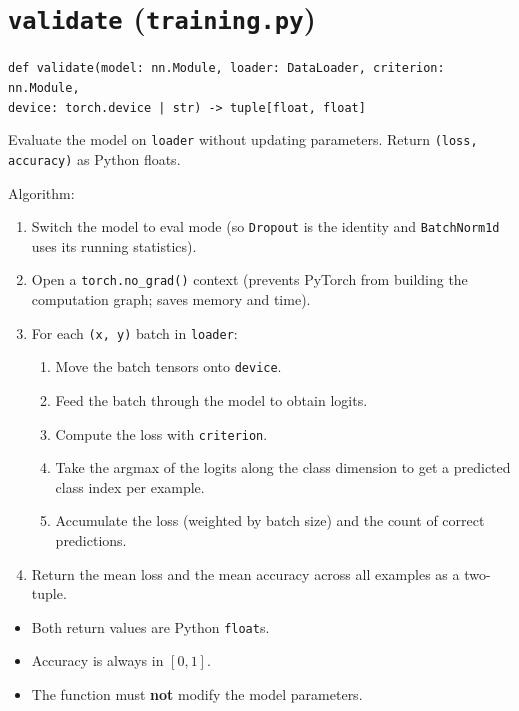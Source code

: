 \documentclass[11pt]{article}
\newcommand{\code}[1]{\texttt{\small #1}}
\begin{document}
\section{\texttt{validate} (\texttt{training.py})}

\noindent
\code{def validate(model: nn.Module, loader: DataLoader, criterion: nn.Module,}\\
\code{\hspace*{2em}device: torch.device | str) -> tuple[float, float]}

\medskip\noindent
Evaluate the model on \code{loader} without updating parameters. Return
\code{(loss, accuracy)} as Python floats.

\medskip\noindent
Algorithm:

\begin{enumerate}
    \item Switch the model to eval mode (so \code{Dropout} is the identity
          and \code{BatchNorm1d} uses its running statistics).
    \item Open a \code{torch.no\_grad()} context (prevents PyTorch from
          building the computation graph; saves memory and time).
    \item For each \code{(x, y)} batch in \code{loader}:
    \begin{enumerate}
        \item Move the batch tensors onto \code{device}.
        \item Feed the batch through the model to obtain logits.
        \item Compute the loss with \code{criterion}.
        \item Take the argmax of the logits along the class dimension to
              get a predicted class index per example.
        \item Accumulate the loss (weighted by batch size) and the count
              of correct predictions.
    \end{enumerate}
    \item Return the mean loss and the mean accuracy across all examples
          as a two-tuple.
\end{enumerate}

\begin{itemize}
    \item Both return values are Python \code{float}s.
    \item Accuracy is always in $[0, 1]$.
    \item The function must \textbf{not} modify the model parameters.
\end{itemize}
\end{document}

